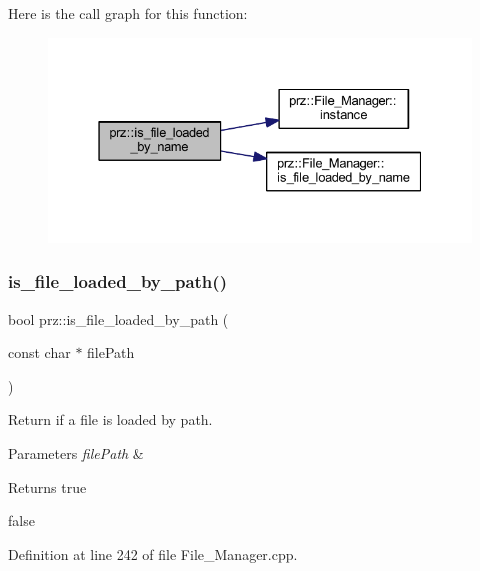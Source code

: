 Here is the call graph for this function\+:
\nopagebreak
\begin{figure}[H]
\begin{center}
\leavevmode
\includegraphics[width=331pt]{namespaceprz_a60a210bc0ab0675f0096a17f18420c7b_cgraph}
\end{center}
\end{figure}
\mbox{\label{namespaceprz_a70392696dda40f3306dbc887daf79478}} 
\subsubsection{\texorpdfstring{is\_file\_loaded\_by\_path()}{is\_file\_loaded\_by\_path()}}
{\footnotesize\ttfamily bool prz\+::is\+\_\+file\+\_\+loaded\+\_\+by\+\_\+path (\begin{DoxyParamCaption}\item[{const char $\ast$}]{file\+Path }\end{DoxyParamCaption})}



Return if a file is loaded by path. 


\begin{DoxyParams}{Parameters}
{\em file\+Path} & \\
\hline
\end{DoxyParams}
\begin{DoxyReturn}{Returns}
true 

false 
\end{DoxyReturn}


Definition at line 242 of file File\+\_\+\+Manager.\+cpp.

